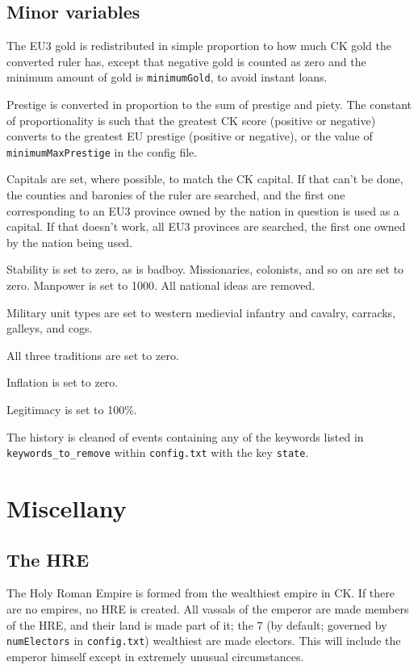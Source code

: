 \documentclass[12pt,ebook,oneside]{book}
\begin{document}
\section{Minor variables}

The EU3 gold is redistributed in simple proportion to
how much CK gold the converted ruler has, except that 
negative gold is counted as zero and the minimum amount
of gold is \verb|minimumGold|, to avoid instant loans. 

Prestige is converted in proportion to the sum of prestige and
piety. The constant of proportionality is such that the greatest
CK score (positive or negative) converts to the greatest EU prestige
(positive or negative), or the value of \verb|minimumMaxPrestige| in
the config file. 

Capitals are set, where possible, to match the CK capital. If that
can't be done, the counties and baronies of the ruler are searched,
and the first one corresponding to an EU3 province owned by the nation
in question is used as a capital. If that doesn't work, all EU3
provinces are searched, the first one owned by the nation being used. 

Stability is set to zero, as is badboy. Missionaries, colonists, and
so on are set to zero. Manpower is set to 1000. All national ideas are
removed. 

Military unit types are set to western medievial infantry and cavalry,
carracks, galleys, and cogs. 

All three traditions are set to zero. 

Inflation is set to zero. 

Legitimacy is set to 100\%. 

The history is cleaned of
events containing any of the keywords listed in
\verb|keywords_to_remove|
within \verb|config.txt| with the key \verb|state|. 

\chapter{Miscellany}

\section{The HRE}

The Holy Roman Empire is formed from the wealthiest empire in CK. If
there are no empires, no HRE is created. All vassals of the emperor
are made members of the HRE, and their land is made part of it; the 7
(by default; governed by \verb|numElectors| in \verb|config.txt|)
wealthiest are made electors. This will include the emperor himself
except in extremely unusual circumstances. 
\end{document}
